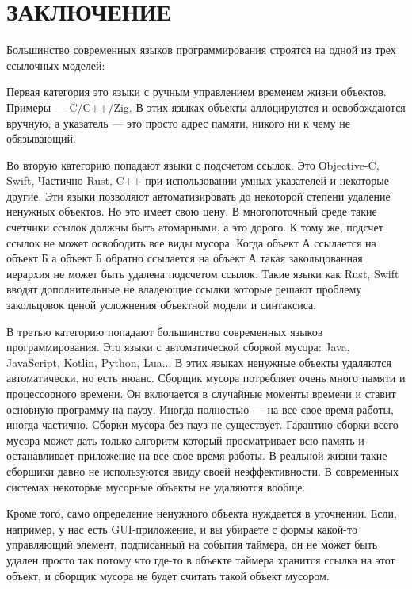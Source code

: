 \part*{ЗАКЛЮЧЕНИЕ}

Большинство современных языков программирования строятся на одной из трех ссылочных моделей:

Первая категория это языки с ручным управлением временем жизни объектов. Примеры — C/C++/Zig. В этих языках объекты аллоцируются и освобождаются вручную, а указатель — это просто адрес памяти, никого ни к чему не обязывающий.

Во вторую категорию попадают языки с подсчетом ссылок. Это Оbjective-C, Swift, Частично Rust, C++ при использовании умных указателей и некоторые другие. Эти языки позволяют автоматизировать до некоторой степени удаление ненужных объектов. Но это имеет свою цену. В многопоточный среде такие счетчики ссылок должны быть атомарными, а это дорого. К тому же, подсчет ссылок не может освободить все виды мусора. Когда объект А ссылается на объект Б а объект Б обратно ссылается на объект А такая закольцованная иерархия не может быть удалена подсчетом ссылок. Такие языки как Rust, Swift вводят дополнительные не владеющие ссылки которые решают проблему закольцовок ценой усложнения объектной модели и синтаксиса.

В третью категорию попадают большинство современных языков программирования. Это языки с автоматической сборкой мусора: Java, JavaScript, Kotlin, Python, Lua... В этих языках ненужные объекты удаляются автоматически, но есть нюанс. Сборщик мусора потребляет очень много памяти и процессорного времени. Он включается в случайные моменты времени и ставит основную программу на паузу. Иногда полностью — на все свое время работы, иногда частично. Сборки мусора без пауз не существует. Гарантию сборки всего мусора может дать только алгоритм который просматривает всю память и останавливает приложение на все свое время работы. В реальной жизни такие сборщики давно не используются ввиду своей неэффективности. В современных системах некоторые мусорные объекты не удаляются вообще.

Кроме того, само определение ненужного объекта нуждается в уточнении. Если, например, у нас есть GUI-приложение, и вы убираете с формы какой-то управляющий элемент, подписанный на события таймера, он не может быть удален просто так потому что где-то в объекте таймера хранится ссылка на этот объект, и сборщик мусора не будет считать такой объект мусором.

